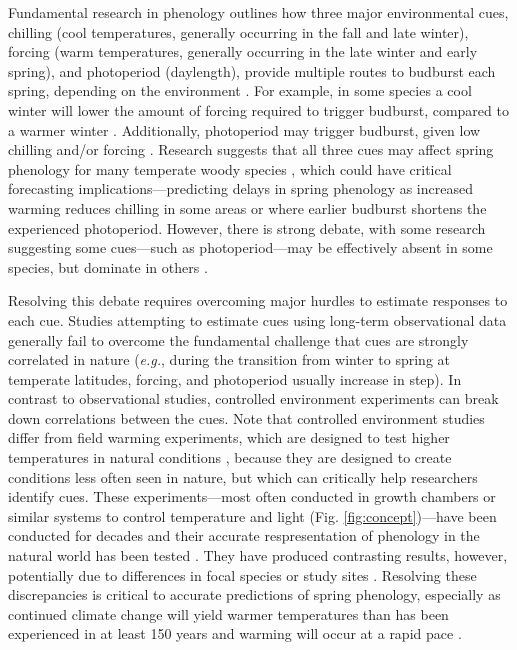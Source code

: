 \documentclass{article}
\begin{document}
\par Fundamental research in phenology outlines how three major environmental cues, chilling (cool temperatures, generally occurring in the fall and late winter), forcing (warm temperatures, generally occurring in the late winter and early spring), and photoperiod (daylength), provide multiple routes to budburst each spring, depending on the environment \emph{\citep{chuine2016}}. For example, in some species a cool winter will lower the amount of forcing required to trigger budburst, compared to a warmer winter \emph{\citep{harrington2015}}. Additionally, photoperiod may trigger budburst, given low chilling and/or forcing \emph{\citep{zohner2016,Basler:2014aa, Caffarra:2011b}}. Research suggests that all three cues may affect spring phenology for many temperate woody species \emph{\citep{flynn2018,Basler:2014aa,Caffarra:2011qf}}, which could have critical forecasting implications---predicting delays in spring phenology as increased warming reduces chilling in some areas \emph{\citep{fraga2019}} or where earlier budburst shortens the experienced photoperiod. However, there is strong debate, with some research suggesting some cues---such as photoperiod---may be effectively absent in some species, but dominate in others \emph{\citep{zohner2016,koerner2010a}}. 

\par Resolving this debate requires overcoming major hurdles to estimate responses to each cue. Studies attempting to estimate cues using long-term observational data \emph{\citep[e.g.,][]{zohner2016,vitasse2013}} generally fail to overcome the fundamental challenge that cues are strongly correlated in nature (\emph{e.g.}, during the transition from winter to spring at temperate latitudes, forcing, and photoperiod usually increase in step). In contrast to observational studies, controlled environment experiments can break down correlations between the cues. 
Note that controlled environment studies differ from field warming experiments, which are designed to test higher temperatures in natural conditions \citep{Wolkovich:2012n}, because they are designed to create conditions less often seen in nature, but which can critically help researchers identify cues. These experiments---most often conducted in growth chambers or similar systems to control temperature and light (Fig. \ref{fig:concept})---have been conducted for decades and their accurate respresentation of phenology in the natural world has been tested \citep{vitasse2014}. They have produced contrasting results, however, potentially due to differences in focal species or study sites \emph{\citep{zohner2016,Caffarra:2011b,Laube:2014a,Basler:2012,Caffarra:2011a}}. Resolving these discrepancies is critical to accurate predictions of spring phenology, especially as continued climate change will yield warmer temperatures than has been experienced in at least 150 years and warming will occur at a rapid pace \citep{ohlemuller2006,williams2007,williams2007b,ipcc2013,xu2018}.
\end{document}
